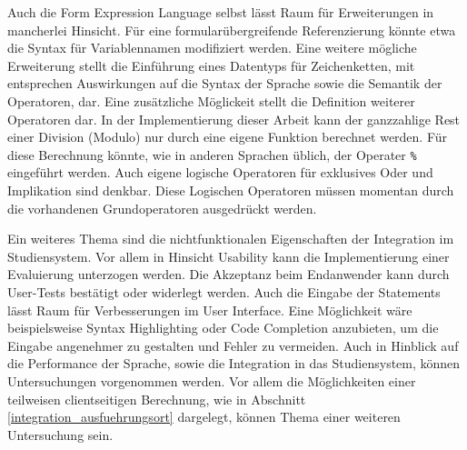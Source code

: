 Auch die Form Expression Language selbst lässt Raum für Erweiterungen in mancherlei Hinsicht. Für eine formularübergreifende Referenzierung könnte etwa die Syntax für Variablennamen modifiziert werden. Eine weitere mögliche Erweiterung stellt die Einführung eines Datentyps für Zeichenketten, mit entsprechen Auswirkungen auf die Syntax der Sprache sowie die Semantik der Operatoren, dar. Eine zusätzliche Möglickeit stellt die Definition weiterer Operatoren dar. In der Implementierung dieser Arbeit kann der ganzzahlige Rest einer Division (Modulo) nur durch eine eigene Funktion berechnet werden. Für diese Berechnung könnte, wie in anderen Sprachen üblich, der Operater \texttt{\%} eingeführt werden. Auch eigene logische Operatoren für exklusives Oder und Implikation sind denkbar. Diese Logischen Operatoren müssen momentan durch die vorhandenen Grundoperatoren ausgedrückt werden.

Ein weiteres Thema sind die nichtfunktionalen Eigenschaften der Integration im Studiensystem. Vor allem in Hinsicht Usability kann die Implementierung einer Evaluierung unterzogen werden. Die Akzeptanz beim Endanwender kann durch User-Tests bestätigt oder widerlegt werden. Auch die Eingabe der Statements lässt Raum für Verbesserungen im User Interface. Eine Möglichkeit wäre beispielsweise Syntax Highlighting oder Code Completion anzubieten, um die Eingabe angenehmer zu gestalten und Fehler zu vermeiden. Auch in Hinblick auf die Performance der Sprache, sowie die Integration in das Studiensystem, können Untersuchungen vorgenommen werden. Vor allem die Möglichkeiten einer teilweisen clientseitigen Berechnung, wie in Abschnitt \ref{integration_ausfuehrungsort} dargelegt, können Thema einer weiteren Untersuchung sein.